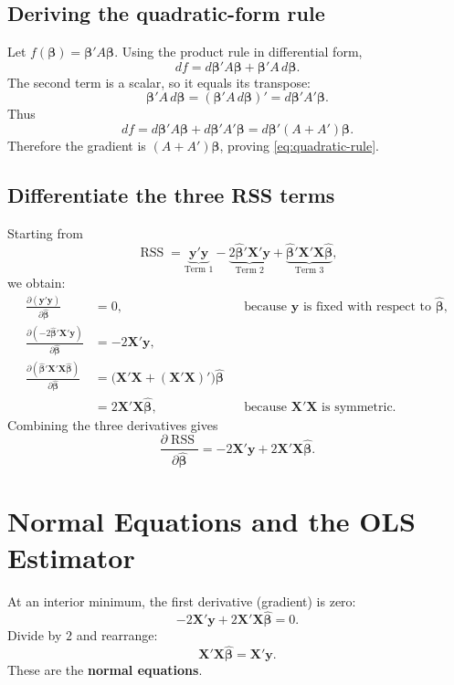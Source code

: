 \documentclass[11pt]{article}
\newcommand{\bhat}{\hat{\boldsymbol{\beta}}}
\newcommand{\XX}{\mathbf{X}}
\newcommand{\yy}{\mathbf{y}}
\newcommand{\RSS}{\operatorname{RSS}}
\begin{document}
\subsection{Deriving the quadratic-form rule}
Let $f(\boldsymbol{\beta})=\boldsymbol{\beta}'A\boldsymbol{\beta}$. Using the product rule in differential form,
\[
df=d\boldsymbol{\beta}'A\boldsymbol{\beta}
+\boldsymbol{\beta}'A\,d\boldsymbol{\beta}.
\]
The second term is a scalar, so it equals its transpose:
\[
\boldsymbol{\beta}'A\,d\boldsymbol{\beta}
=(\boldsymbol{\beta}'A\,d\boldsymbol{\beta})'
=d\boldsymbol{\beta}'A'\boldsymbol{\beta}.
\]
Thus
\[
df=d\boldsymbol{\beta}'A\boldsymbol{\beta}
+d\boldsymbol{\beta}'A'\boldsymbol{\beta}
=d\boldsymbol{\beta}'(A+A')\boldsymbol{\beta}.
\]
Therefore the gradient is $(A+A')\boldsymbol{\beta}$, proving \eqref{eq:quadratic-rule}.

\subsection{Differentiate the three RSS terms}
Starting from
\[
\RSS=\underbrace{\yy'\yy}_{\text{Term 1}}
-\underbrace{2\bhat'\XX'\yy}_{\text{Term 2}}
+\underbrace{\bhat'\XX'\XX\bhat}_{\text{Term 3}},
\]
we obtain:
\begin{align*}
\frac{\partial(\yy'\yy)}{\partial\bhat}&=0,
&&\text{because $\yy$ is fixed with respect to $\bhat$},\\
\frac{\partial(-2\bhat'\XX'\yy)}{\partial\bhat}&=-2\XX'\yy,\\
\frac{\partial(\bhat'\XX'\XX\bhat)}{\partial\bhat}
&=\bigl(\XX'\XX+(\XX'\XX)'\bigr)\bhat\\
&=2\XX'\XX\bhat,
&&\text{because $\XX'\XX$ is symmetric.}
\end{align*}
Combining the three derivatives gives
\begin{equation}
    \boxed{\frac{\partial\RSS}{\partial\bhat}
    =-2\XX'\yy+2\XX'\XX\bhat.}
    \label{eq:rss-gradient}
\end{equation}

\section{Normal Equations and the OLS Estimator}

At an interior minimum, the first derivative (gradient) is zero:
\[
-2\XX'\yy+2\XX'\XX\bhat=0.
\]
Divide by $2$ and rearrange:
\begin{equation}
    \boxed{\XX'\XX\bhat=\XX'\yy.}
    \label{eq:normal}
\end{equation}
These are the \textbf{normal equations}.
\end{document}
